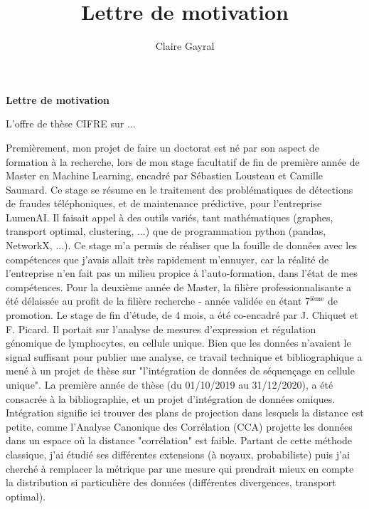\documentclass[a4paper,11pt]{article}
\title{Lettre de motivation}
\author{Claire Gayral}
\date{}
\begin{document}
{\centering \Large \bf Lettre de motivation \\ \vspace{0.6cm} }

L'offre de thèse CIFRE sur ... 



Premièrement, mon projet de faire un doctorat est né par son aspect de formation à la recherche, lors de mon stage facultatif de fin de première année de Master en Machine Learning, encadré par Sébastien Lousteau et Camille Saumard. Ce stage se résume en le traitement des problématiques de détections de fraudes téléphoniques, et de maintenance prédictive, pour l'entreprise LumenAI. Il faisait appel à des outils variés, tant mathématiques (graphes, transport optimal, clustering, ...) que de programmation python (pandas, NetworkX, ...). 
Ce stage m'a permis de réaliser que la fouille de données avec les compétences que j'avais allait très rapidement m'ennuyer, car la réalité de l'entreprise n'en fait pas un milieu propice à l'auto-formation, dans l'état de mes compétences.
Pour la deuxième année de Master, la filière professionnalisante a été délaissée au profit de la filière recherche - année validée en étant 7$^{\text{ième}}$ de promotion.
Le stage de fin d'étude, de 4 mois, a été co-encadré par J. Chiquet et F. Picard. Il portait sur l'analyse de mesures d'expression et régulation génomique de lymphocytes, en cellule unique. Bien que les données n'avaient le signal suffisant pour publier une analyse, ce travail technique et bibliographique a mené à un projet de thèse sur "l'intégration de données de séquençage en cellule unique". La première année de thèse (du 01/10/2019 au 31/12/2020), a été consacrée à la bibliographie, et un projet d'intégration de données omiques. 
%
Intégration signifie ici trouver des plans de projection dans lesquels la distance est petite, comme l'Analyse Canonique des Corrélation (CCA) projette les données dans un espace où la distance "corrélation" est faible. Partant de cette méthode classique, j'ai étudié ses différentes extensions (à noyaux, probabiliste) puis j'ai cherché à remplacer la métrique par une mesure qui prendrait mieux en compte la distribution si particulière des données (différentes divergences, transport optimal). 
\end{document}
